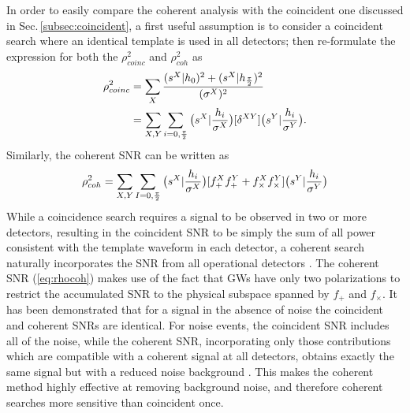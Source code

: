 \documentclass[binding=0.6cm, LaM]{sapthesis}
\begin{document}
	In order to easily compare the coherent analysis with the coincident one discussed in Sec.\,\ref{subsec:coincident},
	a  first useful assumption is to consider a coincident search where an identical template is used in all detectors;
	then re-formulate the expression for both the $\rho^2_{coinc}$ and $\rho^2_{coh}$ as
		\begin{align}
			\rho^2_{coinc} &= \sum_{X} {{(s^X|h_0)^2+(s^X|h_{{\pi}\over{2}})^2} \over {(\sigma^X)^2}}  \\
					&= \sum_{X,Y}\sum_{i=0,{{\pi}\over{2}}}  \big(s^X|{{h_i}\over{\sigma^X}}\big)[\delta^{XY}]\big( s^Y|{{h_i}\over{\sigma^Y}}\big).
		\end{align}
	Similarly, the coherent SNR can be written as
		\begin{equation}
		\label{eq:rhocoh}
			\rho^2_{coh}  = \sum_{X,Y}\sum_{I=0,{{\pi}\over{2}}}  \big(s^X|{{h_i}\over{\sigma^X}}\big)[f_{+}^Xf_{+}^Y+f_{\times}^Xf_{\times}^Y]\big( s^Y|{{h_i}\over{\sigma^Y}}\big)
		\end{equation}
	While a coincidence search requires a signal to be observed in two or more detectors, 
        resulting in the coincident SNR to be simply the sum of all power consistent with the template waveform in each detector,
        a coherent search naturally incorporates the SNR from all operational detectors \cite{45, 46}.
	The coherent SNR (\ref{eq:rhocoh}) makes use of the fact that GWs have only two polarizations 
	to restrict the accumulated SNR to the physical subspace spanned by $f_+$ and $f_{\times}$. 
	It has been demonstrated that for a signal in the absence of noise the coincident and coherent SNRs are identical. 
        For noise events, the coincident SNR includes all of the noise, 
        while the coherent SNR, incorporating only those contributions which are compatible 
        with a coherent signal at all detectors, obtains exactly the same signal but with a reduced noise background \cite{45}.
        This makes the coherent method highly effective at removing background noise, and therefore coherent searches more sensitive than coincident once.
\end{document}
